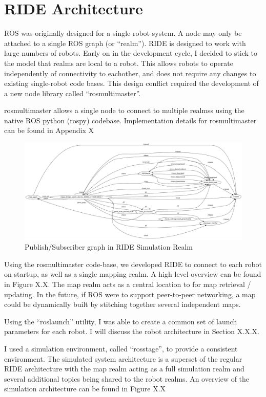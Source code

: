 \section{RIDE Architecture}

ROS was originally designed for a single robot system. A node may only be attached to a single ROS graph (or ``realm''). RIDE is designed to work with large numbers of robots. Early on in the development cycle, I decided to stick to the model that realms are local to a robot. This allows robots to operate independently of connectivity to eachother, and does not require any changes to existing single-robot code bases. This design conflict required the development of a new node library called ``rosmultimaster''.

rosmultimaster allows a single node to connect to multiple realmss using the native ROS python (rospy) codebase. Implementation details for rosmultimaster can be found in Appendix X %

\begin{figure}[ht]
\includegraphics[width=\textwidth]{images/ride-simulation-realm.png}
\caption{Publish/Subscriber graph in RIDE Simulation Realm}
\end{figure}

Using the rosmultimaster code-base, we developed RIDE to connect to each robot on startup, as well as a single mapping realm. A high level overview can be found in Figure X.X. The map realm acts as a central location to for map retrieval / updating. In the future, if ROS were to support peer-to-peer networking, a map could be dynamically built by stitching together several independent maps. 

Using the ``roslaunch'' utility, I was able to create a common set of launch parameters for each robot. I will discuss the robot architecture in Section X.X.X. %

I used a simulation environment, called ``rosstage'', to provide a consistent environment. The simulated system architecture is a superset of the regular RIDE architecture with the map realm acting as a full simulation realm and several additional topics being shared to the robot realms. An overview of the simulation architecture can be found in Figure X.X %

